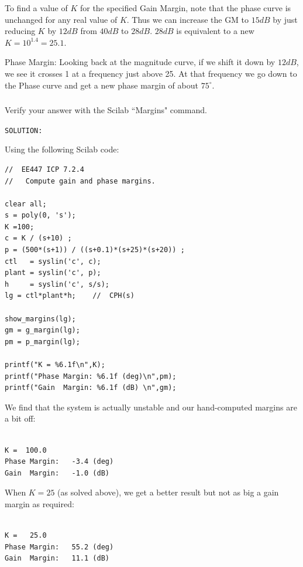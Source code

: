 \documentclass{article}	%
\begin{document}
To find a value of $K$ for the specified Gain Margin, note that the phase curve is unchanged for any real value of $K$.   Thus we can increase the GM to $15dB$ by just reducing $K$ by $12dB$ from $40dB$ to $28dB$.  $28dB$ is equivalent to a new $K=10^{1.4} = 25.1$.

Phase Margin:  Looking back at the magnitude curve, if we shift it down by $12dB$, we see it crosses 1 at a frequency just above 25.  At that frequency we go down to the Phase curve and get a new phase margin of about $75^\circ$.


\subsubsection{}    Verify your answer with the Scilab ``Margins" command.


 {\tt SOLUTION:}	%

Using the following Scilab code:
\begin{verbatim}
//  EE447 ICP 7.2.4
//   Compute gain and phase margins.

clear all;
s = poly(0, 's');
K =100;
c = K / (s+10) ;
p = (500*(s+1)) / ((s+0.1)*(s+25)*(s+20)) ;
ctl   = syslin('c', c);
plant = syslin('c', p);
h     = syslin('c', s/s);
lg = ctl*plant*h;    //  CPH(s)

show_margins(lg);
gm = g_margin(lg);
pm = p_margin(lg);

printf("K = %6.1f\n",K);
printf("Phase Margin: %6.1f (deg)\n",pm);
printf("Gain  Margin: %6.1f (dB) \n",gm);
\end{verbatim}
We find that the system is actually unstable and our hand-computed margins are a bit off:
\begin{verbatim}

K =  100.0
Phase Margin:   -3.4 (deg)
Gain  Margin:   -1.0 (dB)
\end{verbatim}

When $K=25$ (as solved above), we get a better result but not as big a gain margin as required:
\begin{verbatim}

K =   25.0
Phase Margin:   55.2 (deg)
Gain  Margin:   11.1 (dB)
\end{verbatim}








\newpage
\end{document}
